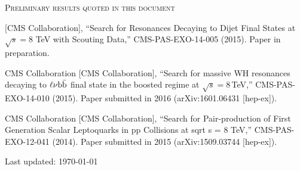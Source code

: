 \documentclass[10pt, a4paper]{article}
\begin{document}
\begin{thebibliography}{599}
\vspace{0.1cm} \begin{center} \textsc{Preliminary results quoted in this document} \end{center} \vspace{0.05cm}

 {}[CMS Collaboration],
  ``Search for Resonances Decaying to Dijet Final States at $\sqrt{s} = 8$ TeV with Scouting Data,''
  CMS-PAS-EXO-14-005 (2015). Paper in preparation.

  CMS Collaboration [CMS Collaboration],
  ``Search for massive WH resonances decaying to $\ell \nu {\rm b \bar{b}}$ final state in the boosted regime at $\sqrt{s}=8$\,TeV,''
  CMS-PAS-EXO-14-010 (2015). Paper submitted in 2016 (arXiv:1601.06431 [hep-ex]).

  CMS Collaboration [CMS Collaboration],
  ``Search for Pair-production of First Generation Scalar Leptoquarks in pp Collisions at sqrt s = 8 TeV,''
  CMS-PAS-EXO-12-041 (2014). Paper submitted in 2015 (arXiv:1509.03744
  [hep-ex]).

\end{thebibliography}

\vfill{}
\hrulefill

\begin{center}
{\footnotesize Last updated: \today}
\end{center}
\end{document}

